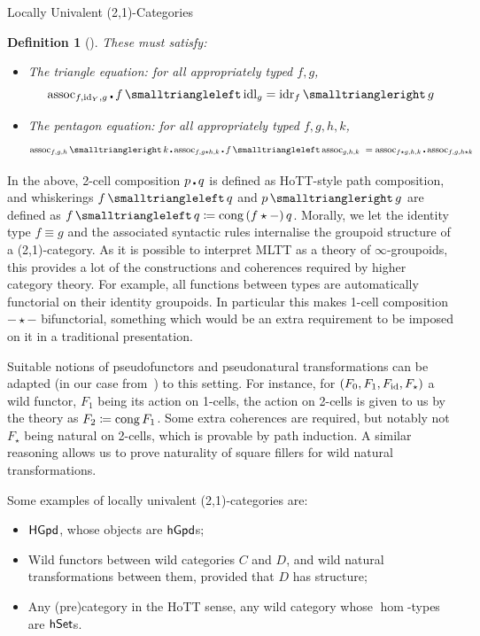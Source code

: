 \documentclass[a4paper]{easychair}
\newtheorem*{definition}{Definition}
\begin{document}
\begin{section}{Locally Univalent (2,1)-Categories}
\begin{definition}[\lutc{}]
    These must satisfy:

    \begin{itemize}
      \item The triangle equation: for all appropriately typed \(f, g\),
            \[
              \assoc_{f, \id_Y,g} \ct f \trl \idl_g = \idr_f \trr g
            \]
      \item The pentagon equation: for all appropriately typed \(f, g, h, k\),
            \[
              \assoc_{f,g,h} \trr k \ct \assoc_{f,g \star h,k} \ct f \trl \assoc_{g,h,k} \
              = \assoc_{f \star g,h,k} \ct \assoc_{f,g,h \star k}
            \]
    \end{itemize}
  \end{definition}

  In the above, 2-cell composition \(p \operatorname{\mathbin\centerdot} q\) is defined as HoTT-style path
  composition, and whiskerings \(f \trl q\) and \(p \trr g\) are defined as
  \eg{} \(f \trl q \defas \cong \, (f \star-) \, q\). Morally, we let the
  identity type \(f \equiv g\) and the associated syntactic rules internalise
  the groupoid structure of a (2,1)-category. As it is possible to interpret
  MLTT as a theory of \(\infty\)-groupoids, this provides a lot of the
  constructions and coherences required by higher category theory. For example,
  all functions between types are automatically functorial on their identity
  groupoids. In particular this makes 1-cell composition \(- \star -\)
  bifunctorial, something which would be an extra requirement to be imposed on
  it in a traditional presentation.

  Suitable notions of pseudofunctors and pseudonatural transformations can be
  adapted (in our case from~\cite{Johnson2020}) to this setting. For instance,
  for \((F_0, F_1, F_{\operatorname{id}}, F_{\star})\) a wild functor, \(F_1\) being its
  action on 1-cells, the action on 2-cells is given to us by the theory as
  \(F_2 \coloneq \operatorname{cong} F_1\). Some extra coherences are required, but notably not
  \(F_\star\) being natural on 2-cells, which is provable by path induction. A
  similar reasoning allows us to prove naturality of square fillers for wild
  natural transformations.

  Some examples of locally univalent (2,1)-categories are:

  \begin{itemize}
    \item \(\mathsf{HGpd}\), whose objects are \(\mathsf{hGpd}\)s;

    \item Wild functors between wild categories \(C\) and \(D\), and
      wild natural transformations between them, provided that \(D\)
      has \lutc{} structure;

    \item Any (pre)category in the HoTT sense, \ie{} any wild category whose
          \(\hom\)-types are \(\mathsf{hSet}\)s.
  \end{itemize}

\end{section}
\end{document}

